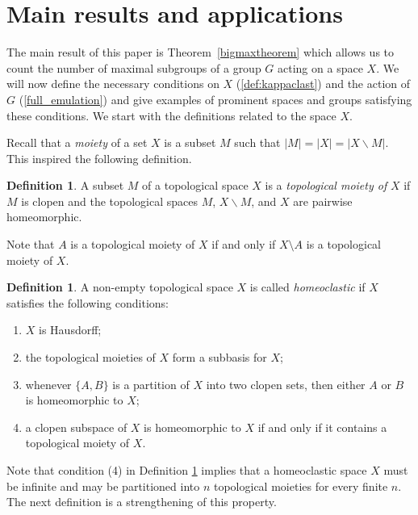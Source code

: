 \documentclass[11pt]{amsart}
\theoremstyle{definition}
\newtheorem{definition}[theorem]{Definition}
\begin{document}
\section{Main results and applications}\label{section:main_results}



 The main result of this paper is Theorem~\ref{bigmaxtheorem} which 
 allows us to count the number of maximal subgroups of a group $G$ acting on a space $X$. We will now define the necessary conditions on $X$ (\cref{def:kappaclast}) and the action of $G$ (\cref{full_emulation}) and give examples of prominent spaces and groups satisfying these conditions. We start with the definitions related to the space $X$.
 
 Recall that a {\em moiety} of a set \(X\) is a subset \(M\) such that \(|M|=|X|=|X\backslash M|\). This inspired the following definition.


\begin{definition}
    A subset \(M\) of a topological space \(X\) is a \emph{topological moiety of} $X$ if \(M\) is clopen and the topological spaces \(M\), \(X\backslash M\), and \(X\) are pairwise homeomorphic.
\end{definition}

Note that $A$ is a topological moiety of $X$ if and only if $X\setminus A$ is a topological moiety of $X$.

\begin{definition}\label{clastic}
    A non-empty topological space \(X\) is called \emph{homeoclastic} if \(X\) satisfies the following conditions:
    \begin{enumerate}
        \item \(X\) is Hausdorff;
        \item the topological moieties of \(X\) form a subbasis for \(X\);
         \item whenever \(\{A,B\}\) is a partition of \(X\) into two clopen sets, then either \(A\) or \(B\) is homeomorphic to \(X\);
        \item a clopen subspace of \(X\) is homeomorphic to \(X\) if and only if it contains a topological moiety of \(X\).
    \end{enumerate}
\end{definition}

Note that condition (4) in Definition \ref{clastic} implies that a homeoclastic space $X$ must be infinite and may be partitioned into $n$ topological moieties for every finite $n$. The next definition is a strengthening of this property. 
\end{document}

